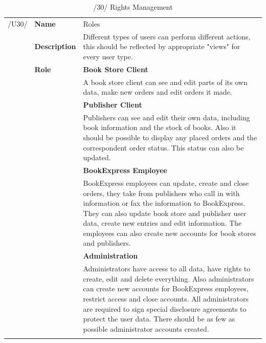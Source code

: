 \documentclass[11pt,a4paper,oneside,svgnames]{report}
\begin{document}
\begin{table}[H]
\centering
\begin{tabular}{llp{8.75cm}}
\cellcolor{white}/U30/	& \textbf{Name}			& Roles\\
\cellcolor{white}		& \textbf{Description}	& Different types of users can perform different actions, this should be reflected by appropriate "views" for every user type.\\
\cellcolor{white}		& \textbf{Role}			& \textbf{Book Store Client}\\
\cellcolor{white}		&						& A book store client can see and edit parts of its own data, make new orders and edit orders it made.\\
\cellcolor{white}		&						& \textbf{Publisher Client}\\
\cellcolor{white}		&						& Publishers can see and edit their own data, including book information and the stock of books. Also it should be possible to display any placed orders and the correspondent order status. This status can also be updated.\\
\cellcolor{white}		&						& \textbf{BookExpress Employee}\\
\cellcolor{white}		&						& BookExpress employees can update, create and close orders, they take from publishers who call in with information or fax the information to BookExpress. They can also update book store and publisher user data, create new entries and edit information. The employees can also create new accounts for book stores and publishers.\\
\cellcolor{white}		&						& \textbf{Administration}\\
\cellcolor{white}		&						& Administrators have access to all data, have rights to create, edit and delete everything. Also administrators can create new accounts for BookExpress employees, restrict access and close accounts. All administrators are required to sign special disclosure agreements to protect the user data. There should be as few as possible administrator accounts created.\\
\cellcolor{white}		\hfill \\
\end{tabular}
\caption{/30/ Rights Management}
\label{tab:u30}
\end{table}
\end{document}
